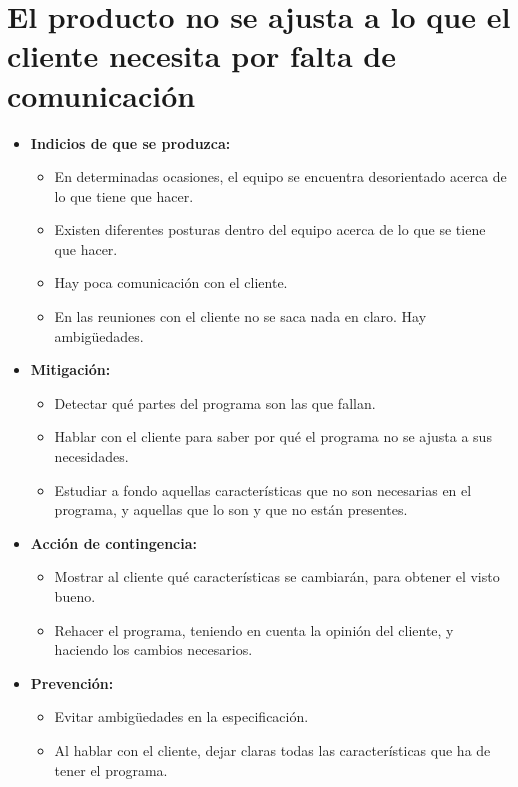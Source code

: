 \documentclass[spanish,a4paper,11pt, twoside]{report}	%
\begin{document}
	\section{El producto no se ajusta a lo que el cliente necesita por falta de comunicación}
		\begin{itemize}
			\item \textbf {Indicios de que se produzca: }
				\begin{itemize}
					\item En determinadas ocasiones, el equipo se encuentra desorientado acerca de lo que tiene que hacer.
					\item Existen diferentes posturas dentro del equipo acerca de lo que se tiene que hacer. 
					\item Hay poca comunicación con el cliente.
					\item En las reuniones con el cliente no se saca nada en claro. Hay ambigüedades.
				\end{itemize}
			\item \textbf {Mitigación: }
				\begin{itemize}
				  \item Detectar qué partes del programa son las que fallan.  
				  \item Hablar con el cliente para saber por qué el programa no se ajusta a sus necesidades. 
				  \item Estudiar a fondo aquellas características que no son necesarias en el programa, y aquellas
				  		que lo son y que no están presentes.
				\end{itemize} 
			\item \textbf {Acción de contingencia: }
				\begin{itemize}
				  \item  Mostrar al cliente qué características se cambiarán, para obtener el visto bueno.
				  \item Rehacer el programa, teniendo en cuenta la opinión del cliente, y haciendo los cambios necesarios.
				\end{itemize} 
			\item \textbf {Prevención: }
				\begin{itemize}
				  \item Evitar ambigüedades en la especificación.
				  \item Al hablar con el cliente, dejar claras todas las características que ha de tener el programa.  
				\end{itemize} 
			
		\end{itemize}
	
	
		


\newpage
\mbox{}
\thispagestyle{empty}						%
\newpage
\end{document}
